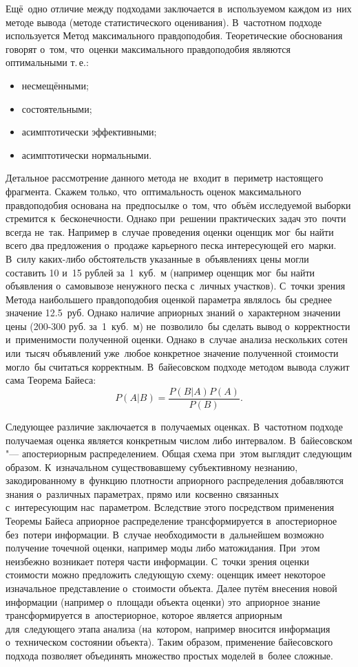 \documentclass[]{scrartcl}
\begin{document}
Ещё~одно отличие между подходами заключается в~используемом каждом из~них методе вывода (методе статистического оценивания). В~частотном подходе используется Метод максимального правдоподобия. Теоретические обоснования говорят о~том, что~оценки максимального правдоподобия являются оптимальными т.\,е.:
	\begin{itemize}
		\item несмещёнными;
		\item состоятельными;
		\item асимптотически эффективными;
		\item асимптотически нормальными.
	\end{itemize}
Детальное рассмотрение данного метода не~входит в~периметр настоящего фрагмента. Скажем только, что~оптимальность оценок максимального правдоподобия основана на~предпосылке о~том, что~объём исследуемой выборки стремится к~бесконечности. Однако при~решении практических задач это~почти всегда не~так. Например в~случае проведения оценки оценщик мог~бы найти всего два предложения о~продаже карьерного песка интересующей его~марки. В~силу каких-либо обстоятельств указанные в~объявлениях цены могли составить 10 и~15 рублей за~1~куб.~м (например оценщик мог~бы найти объявления о~самовывозе ненужного песка с~личных участков). С~точки зрения Метода наибольшего правдоподобия оценкой параметра являлось~бы среднее значение 12.5~руб. Однако наличие априорных знаний о~характерном значении цены (200-300 руб. за~1~куб.~м) не~позволило~бы сделать вывод о~корректности и~применимости полученной оценки. Однако в~случае анализа нескольких сотен или~тысяч объявлений уже~любое конкретное значение полученной стоимости могло~бы считаться корректным. В~байесовском подходе методом вывода служит сама Теорема Байеса:
\begin{equation}\label{Bayes-Theorem}
P(A|B) = \frac{P(B|A)P(A)}{P(B)}.
\end{equation}

Следующее различие заключается в~получаемых оценках. В~частотном подходе получаемая оценка является конкретным числом либо интервалом. В~байесовском "--- апостериорным распределением. Общая схема при~этом выглядит следующим образом. К~изначальном существовавшему субъективному незнанию, закодированному в~функцию плотности априорного распределения добавляются знания о~различных параметрах, прямо или~косвенно связанных с~интересующим нас~параметром. Вследствие этого посредством применения Теоремы Байеса априорное распределение трансформируется в~апостериорное без~потери информации. В~случае необходимости в~дальнейшем возможно получение точечной оценки, например моды либо матожидания. При~этом неизбежно возникает потеря части информации. С~точки зрения оценки стоимости можно предложить следующую схему: оценщик имеет некоторое изначальное представление о~стоимости объекта. Далее путём внесения новой информации (например о~площади объекта оценки) это~априорное знание трансформируется в~апостериорное, которое является априорным для~следующего этапа анализа (на~котором, например вносится информация о~техническом состоянии объекта). Таким образом, применение байесовского подхода позволяет объединять множество простых моделей в~более сложные.
\end{document}
